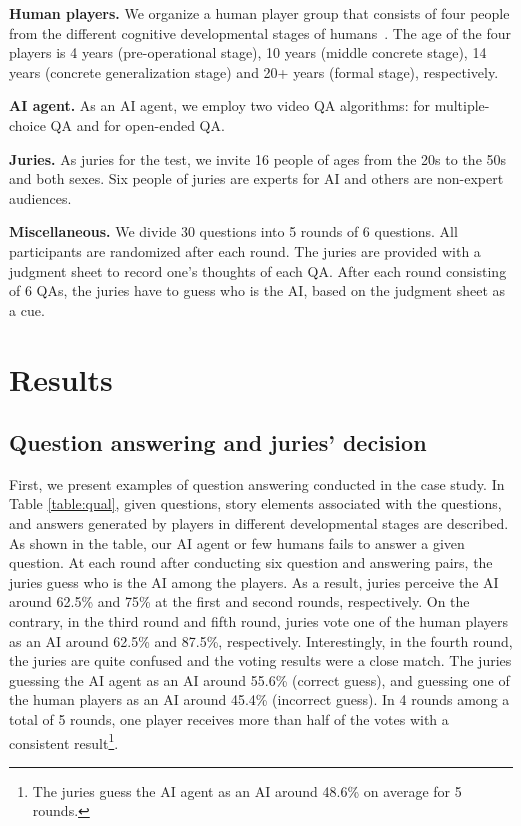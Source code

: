 \documentclass[letterpaper]{article} %
\begin{document}
\noindent \textbf{Human players.  }
We organize a human player group that consists of four people from the different cognitive developmental stages of humans~\cite{hierarchicalQnA2019heo}. The age of the four players is 4 years (pre-operational stage), 10 years (middle concrete stage), 14 years (concrete generalization stage) and 20+ years (formal stage), respectively.

\noindent \textbf{AI agent.  }
As an AI agent, we employ two video QA algorithms: \cite{choi2021dramaqa} for multiple-choice QA and \cite{lee2021mounting} for open-ended QA.

\noindent \textbf{Juries.  }
As juries for the test, we invite 16 people of ages from the 20s to the 50s and both sexes. Six people of juries are experts for AI and others are non-expert audiences.

\noindent \textbf{Miscellaneous.  }
We divide 30 questions into 5 rounds of 6 questions. All participants are randomized after each round.
The juries are provided with a judgment sheet to record one's thoughts of each QA. After each round consisting of 6 QAs, the juries have to guess who is the AI, based on the judgment sheet as a cue.

\section{Results}

\subsection{Question answering and juries' decision}
First, we present examples of question answering conducted in the case study. In Table \ref{table:qual}, given questions, story elements associated with the questions, and answers generated by players in different developmental stages are described. As shown in the table, our AI agent or few humans fails to answer a given question. At each round after conducting six question and answering pairs, the juries guess who is the AI among the players. As a result, juries perceive the AI around 62.5\% and 75\% at the first and second rounds, respectively. On the contrary, in the third round and fifth round, juries vote one of the human players as an AI around 62.5\% and 87.5\%, respectively. Interestingly, in the fourth round, the juries are quite confused and the voting results were a close match. The juries guessing the AI agent as an AI around 55.6\% (correct guess), and guessing one of the human players as an AI around 45.4\% (incorrect guess). In 4 rounds among a total of 5 rounds, one player receives more than half of the votes with a consistent result\footnote{The juries guess the AI agent as an AI around 48.6\% on average for 5 rounds.}.
\end{document}
